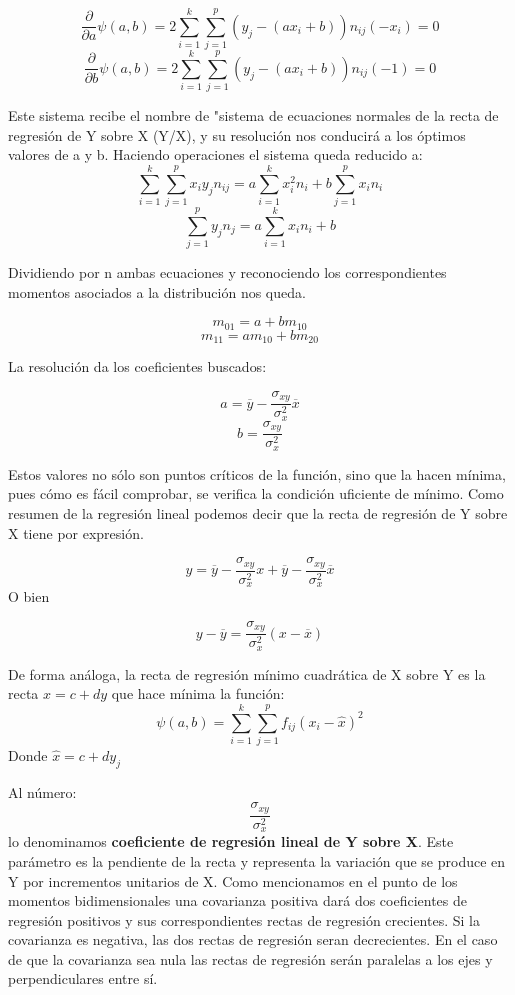 \documentclass{article}
\begin{document}
	$$ \frac{\partial}{\partial a} \psi(a,b) = 2 \sum_{i=1}^k \sum_{j=1}^p ( y_j - (ax_i +b )) n_{ij} (-x_i) = 0 $$
	$$ \frac{\partial}{\partial b} \psi(a,b) = 2 \sum_{i=1}^k \sum_{j=1}^p ( y_j - (ax_i +b )) n_{ij} (-1) = 0 $$
	
	Este sistema recibe el nombre de "sistema de ecuaciones normales de la recta de regresión de Y sobre X (Y/X), y su resolución nos conducirá a los óptimos valores de a y b. Haciendo operaciones el sistema queda reducido a:
	$$  \sum_{i=1}^k \sum_{j=1}^p x_i y_j n_{ij}  = a \sum_{i=1}^k x_i^2 n_i + b\sum_{j= 1}^p x_i n_i $$
	$$ \sum_{j=1}^p y_j n_j = a \sum_{i=1}^k x_i n_i + b $$
	
	Dividiendo por n ambas ecuaciones y reconociendo los correspondientes momentos asociados a la distribución nos queda.
	
	$$
	m_{01} = a + bm_{10}$$
	$$
	m_{11} = am_{10} + bm_{20}
	$$	
	
	La resolución da los coeficientes buscados:
	
	$$
	a = \overline{y} - \frac{\sigma_{xy}}{\sigma_x^2} \overline{x}
$$	 
$$  b = \frac{\sigma_{xy}}{\sigma_x^2} $$
	 
	 Estos valores no sólo son puntos críticos de la función, sino que la hacen mínima, pues cómo es fácil comprobar, se verifica la condición uficiente de mínimo. Como resumen de la regresión lineal podemos decir que la recta de regresión de Y sobre X tiene por expresión.
	 
	$$ y = \overline{y} - \frac{\sigma_{xy}}{\sigma_x^2} x + \overline{y} - \frac{\sigma_{xy}}{\sigma_x^2} \overline{x}$$
	O bien
	
	$$ y - \overline{y} = \frac{\sigma_{xy}}{\sigma_x^2} (x - \overline{x}) $$
	
	De forma análoga, la recta de regresión mínimo cuadrática de X sobre Y es la recta $x = c +dy$ que hace mínima la función:
		$$\psi (a,b) = \sum_{i=1}^k \sum_{j=1}^p f_{ij} (x_i - \hat{x})^2 $$
	Donde $\hat{x} = c +dy_j $
	
	\vspace{2mm}
	
	Al número: $$\frac{\sigma_{xy}}{\sigma_x^2}$$ lo denominamos \textbf{coeficiente de regresión lineal de Y sobre X}. Este parámetro es la pendiente de la recta y representa la variación que se produce en Y por incrementos unitarios de X. Como mencionamos en el punto de los momentos bidimensionales una covarianza positiva dará dos coeficientes de regresión positivos y sus correspondientes rectas de regresión crecientes. Si la covarianza es negativa, las dos rectas de regresión seran decrecientes. En el caso de que la covarianza sea nula las rectas de regresión serán paralelas a los ejes y perpendiculares entre sí.
	
\end{document}
